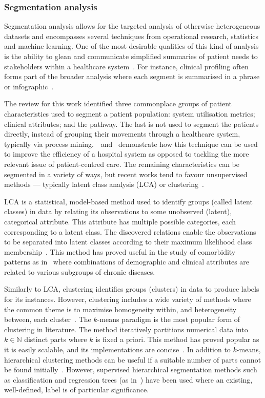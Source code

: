 \documentclass[11pt]{article}
\begin{document}
\subsubsection{Segmentation analysis}

Segmentation analysis allows for the targeted analysis of otherwise
heterogeneous datasets and encompasses several techniques from operational
research, statistics and machine learning. One of the most desirable qualities
of this kind of analysis is the ability to glean and communicate simplified
summaries of patient needs to stakeholders within a healthcare
system~\cite{Vuik2016b, Yoon2020}. For instance, clinical profiling often forms
part of the broader analysis where each segment is summarised in a phrase or
infographic~\cite{Vuik2016a, Yan2019}.

The review for this work identified three commonplace groups of patient
characteristics used to segment a patient population: system utilisation
metrics; clinical attributes; and the pathway. The last is not used to segment
the patients directly, instead of grouping their movements through a healthcare
system, typically via process mining.~\cite{Arnolds2018}~and~\cite{Delias2015}
demonstrate how this technique can be used to improve the efficiency of a
hospital system as opposed to tackling the more relevant issue of
patient-centred care. The remaining characteristics can be segmented in a
variety of ways, but recent works tend to favour unsupervised methods —
typically latent class analysis (LCA) or clustering~\cite{Yan2018}.

LCA is a statistical, model-based method used to identify groups (called latent
classes) in data by relating its observations to some unobserved (latent),
categorical attribute. This attribute has multiple possible categories, each
corresponding to a latent class. The discovered relations enable the
observations to be separated into latent classes according to their maximum
likelihood class membership~\cite{Hagenaars2002,Lazarsfeld1968}. This method has
proved useful in the study of comorbidity patterns as
in~\cite{Kuwornu2014,Larsen2017} where combinations of demographic and clinical
attributes are related to various subgroups of chronic diseases.

Similarly to LCA, clustering identifies groups (clusters) in data to produce
labels for its instances. However, clustering includes a wide variety of methods
where the common theme is to maximise homogeneity within, and heterogeneity
between, each cluster~\cite{Everitt2011}. The \(k\)-means paradigm is the most
popular form of clustering in literature. The method iteratively partitions
numerical data into \(k \in \mathbb N\) distinct parts where \(k\) is fixed a
priori. This method has proved popular as it is easily scalable, and its
implementations are concise~\cite{Olafsson2008,Wu2009}. In addition to
\(k\)-means, hierarchical clustering methods can be useful if a suitable number
of parts cannot be found initially~\cite{Vuik2016a}. However, supervised
hierarchical segmentation methods such as classification and regression trees
(as in~\cite{Harper2006}) have been used where an existing, well-defined, label
is of particular significance.
\end{document}
